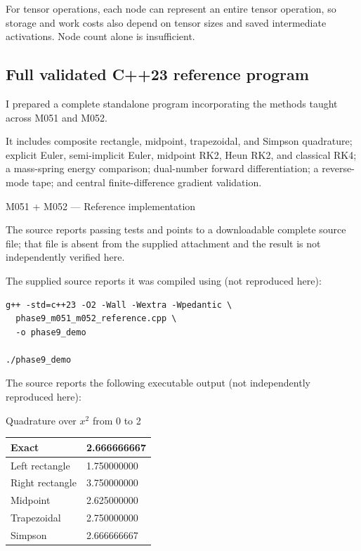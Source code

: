 For tensor operations, each node can represent an entire tensor operation, so storage and work costs also depend on tensor sizes and saved intermediate activations. Node count alone is insufficient.

\subsection{Full validated C++23 reference program}\label{02-foundations-ii-ch022-full-validated-c23-reference-program}

\hypertarget{02-foundations-ii-ch022-full-validated-c23-reference-program}{}

I prepared a complete standalone program incorporating the methods taught across M051 and M052.

It includes composite rectangle, midpoint, trapezoidal, and Simpson quadrature; explicit Euler, semi-implicit Euler, midpoint RK2, Heun RK2, and classical RK4; a mass-spring energy comparison; dual-number forward differentiation; a reverse-mode tape; and central finite-difference gradient validation.

M051 + M052 --- Reference implementation

The source reports passing tests and points to a downloadable complete source file; that file is absent from the supplied attachment and the result is not independently verified here.

The supplied source reports it was compiled using (not reproduced here):

\begin{verbatim}
g++ -std=c++23 -O2 -Wall -Wextra -Wpedantic \
  phase9_m051_m052_reference.cpp \
  -o phase9_demo

./phase9_demo
\end{verbatim}

The source reports the following executable output (not independently reproduced here):

Quadrature over \(x^2\) from 0 to 2

{\def\LTcaptype{none} %
\begin{longtable}[]{@{}ll@{}}
\toprule\noalign{}
Exact & 2.666666667 \\
\midrule\noalign{}
\endhead
\bottomrule\noalign{}
\endlastfoot
Left rectangle & 1.750000000 \\
Right rectangle & 3.750000000 \\
Midpoint & 2.625000000 \\
Trapezoidal & 2.750000000 \\
Simpson & 2.666666667 \\
\end{longtable}
}

